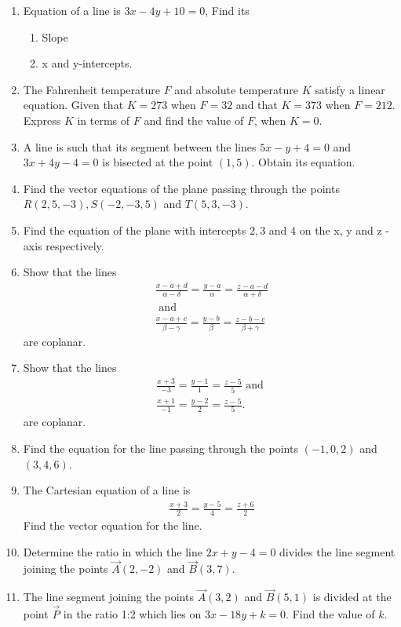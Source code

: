 \begin{enumerate}[label=\thesubsection.\arabic*, ref=\thesubsection.\theenumi]
\item Equation of a line is $3x-4y+10=0$, Find its
\begin{enumerate}
\item  Slope
\item  x and y-intercepts.
\end{enumerate}
\item The Fahrenheit temperature $F$ and  absolute temperature $K$ satisfy a linear equation. Given that $K=273$ when $F=32$ and that $K=373$ when $F=212$. Express $K$ in terms of $F$ and find the value of $F$, when $K=0$.
\item A line is such that its segment between the lines $5x-y+4=0$ and $3x+4y-4=0$ is bisected at the point $(1,5)$. Obtain its equation.
\item Find the vector equations of the plane passing through the points $R(2, 5, -3), S(-2, -3, 5)$ and $T(5, 3, -3)$.
\item Find the equation of the plane with intercepts $2, 3$ and $4$ on the x, y and z - axis respectively.
\item Show that the lines 
\begin{align}
\frac{x-a+d}{\alpha -\delta} =\frac{y-a}{\alpha} =\frac{z-a-d}{\alpha +\delta}\\
 \text{  and } 
	\\
	\frac{x-a+c}{\beta -\gamma} =\frac{y -b}{\beta} =\frac{z-b-c}{\beta +\gamma} 
\end{align}
 are coplanar.
\item Show that the lines 
\begin{align}
\frac{x+3}{-3}= \frac{y-1}{1}= \frac{z-5}{5} \text{ and } 
	\\
	\frac{x+1}{-1} =\frac{y-2}{2} =\frac{z-5}{5}. 
\end{align}
are coplanar.
\item Find the equation for the line passing through the points $(-1, 0, 2)$ and $(3, 4, 6)$.
\item The Cartesian equation of a line is
\begin{align}
\frac{x+3}{2}= \frac{y-5}{4}= \frac{z+6}{2}
\end{align} 
Find the vector equation for the line.
\item Determine the ratio in which the line $2x+y  - 4=0$ divides the line segment joining the points  $\vec{A}(2, - 2)$  and  $\vec{B}(3, 7)$.
\\
\solution
	
\item The line segment joining the points $\vec{A}(3,2)$ and $\vec{B}(5,1)$ is divided at the point $\vec{P}$ in the ratio 1:2 which lies on $3x-18y+k=0$. Find the value of $k$.  

\end{enumerate}
